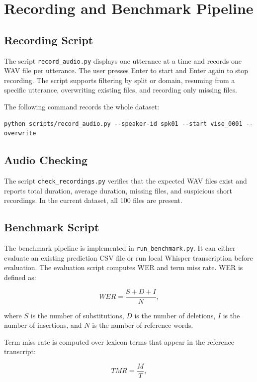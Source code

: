 \documentclass[conference]{IEEEtran}
\begin{document}
\section{Recording and Benchmark Pipeline}
\subsection{Recording Script}
The script \texttt{record\_audio.py} displays one utterance at a time and records one WAV file per utterance. The user presses Enter to start and Enter again to stop recording. The script supports filtering by split or domain, resuming from a specific utterance, overwriting existing files, and recording only missing files.

The following command records the whole dataset:
\begin{verbatim}
python scripts/record_audio.py --speaker-id spk01 --start vise_0001 --overwrite
\end{verbatim}

\subsection{Audio Checking}
The script \texttt{check\_recordings.py} verifies that the expected WAV files exist and reports total duration, average duration, missing files, and suspicious short recordings. In the current dataset, all 100 files are present.

\subsection{Benchmark Script}
The benchmark pipeline is implemented in \texttt{run\_benchmark.py}. It can either evaluate an existing prediction CSV file or run local Whisper transcription before evaluation. The evaluation script computes WER and term miss rate. WER is defined as:

\begin{equation}
WER = \frac{S + D + I}{N},
\end{equation}

where $S$ is the number of substitutions, $D$ is the number of deletions, $I$ is the number of insertions, and $N$ is the number of reference words.

Term miss rate is computed over lexicon terms that appear in the reference transcript:

\begin{equation}
TMR = \frac{M}{T},
\end{equation}
\end{document}
